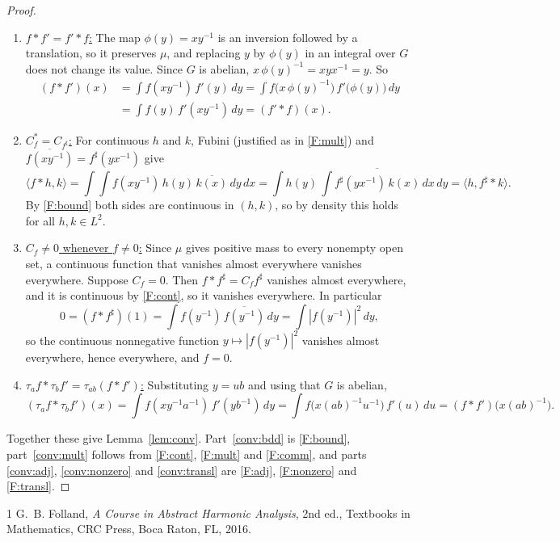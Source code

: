 \documentclass[11pt]{article}
\begin{document}
\begin{proof}
\begin{enumerate}[label=(F\arabic*),leftmargin=*]
  \item\label{F:comm} \uline{$f * f' = f' * f$:} The map $\phi(y) = xy^{-1}$ is an inversion followed by a translation, so it preserves $\mu$, and replacing $y$ by $\phi(y)$ in an integral over $G$ does not change its value. Since $G$ is abelian, $x\,\phi(y)^{-1} = xyx^{-1} = y$. So
  \begin{align*}
    (f * f')(x) &= \int f(xy^{-1})\,f'(y)\,dy = \int f\bigl(x\,\phi(y)^{-1}\bigr)\,f'\bigl(\phi(y)\bigr)\,dy \\
    &= \int f(y)\,f'(xy^{-1})\,dy = (f' * f)(x).
  \end{align*}

  \item\label{F:adj} \uline{$C_f^* = C_{f^\sharp}$:} For continuous $h$ and $k$, Fubini (justified as in \ref{F:mult}) and $\overline{f(xy^{-1})} = f^\sharp(yx^{-1})$ give
  \[
    \langle f * h, k \rangle = \int\!\!\int f(xy^{-1})\,h(y)\,\overline{k(x)}\,dy\,dx = \int h(y)\,\overline{\int f^\sharp(yx^{-1})\,k(x)\,dx}\,dy = \langle h, f^\sharp * k \rangle.
  \]
  By \ref{F:bound} both sides are continuous in $(h, k)$, so by density this holds for all $h, k \in L^2$.

  \item\label{F:nonzero} \uline{$C_f \neq 0$ whenever $f \neq 0$:} Since $\mu$ gives positive mass to every nonempty open set, a continuous function that vanishes almost everywhere vanishes everywhere. Suppose $C_f = 0$. Then $f * f^\sharp = C_f f^\sharp$ vanishes almost everywhere, and it is continuous by \ref{F:cont}, so it vanishes everywhere. In particular
  \[
    0 = (f * f^\sharp)(1) = \int f(y^{-1})\,\overline{f(y^{-1})}\,dy = \int |f(y^{-1})|^2\,dy,
  \]
  so the continuous nonnegative function $y \mapsto |f(y^{-1})|^2$ vanishes almost everywhere, hence everywhere, and $f = 0$.

  \item\label{F:transl} \uline{$\tau_a f * \tau_b f' = \tau_{ab}(f * f')$:} Substituting $y = ub$ and using that $G$ is abelian,
  \[
    (\tau_a f * \tau_b f')(x) = \int f(xy^{-1}a^{-1})\,f'(yb^{-1})\,dy = \int f\bigl(x(ab)^{-1}u^{-1}\bigr)\,f'(u)\,du = (f * f')\bigl(x(ab)^{-1}\bigr).
  \]
\end{enumerate}
Together these give Lemma~\ref{lem:conv}. Part~\ref{conv:bdd} is \ref{F:bound}, part~\ref{conv:mult} follows from \ref{F:cont}, \ref{F:mult} and \ref{F:comm}, and parts \ref{conv:adj}, \ref{conv:nonzero} and \ref{conv:transl} are \ref{F:adj}, \ref{F:nonzero} and \ref{F:transl}.
\end{proof}

\begin{thebibliography}{1}
 G.~B. Folland, \emph{A Course in Abstract Harmonic Analysis}, 2nd ed., Textbooks in Mathematics, CRC Press, Boca Raton, FL, 2016.
\end{thebibliography}
\end{document}
